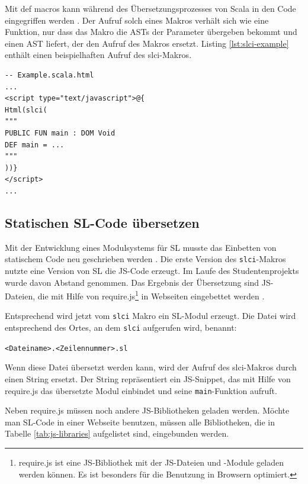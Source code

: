 \documentclass[12pt,bibtotoc]{scrreprt}
\begin{document}
Mit def macros kann während des Übersetzungsprozesses von Scala in den Code eingegriffen werden \cite{EPFL2}. Der Aufruf solch eines Makros verhält sich wie eine Funktion, nur dass das Makro die \ac{AST}s der Parameter übergeben bekommt und einen \ac{AST} liefert, der den Aufruf des Makros ersetzt. Listing \ref{lst:slci-example} enthält einen beispielhaften Aufruf des slci-Makros.

\begin{lstlisting}[caption={Beispielaufruf des slci-Makros in einer Play-View}, label=lst:slci-example, float=h]
-- Example.scala.html
...
<script type="text/javascript">@{
Html(slci(
"""
PUBLIC FUN main : DOM Void
DEF main = ...
"""
))}
</script>
...
\end{lstlisting}

\subsection{Statischen SL-Code übersetzen}
\label{subsec:compile-static-sl}

Mit der Entwicklung eines Modulsystems für \ac{SL} musste das Einbetten von statischem Code neu geschrieben werden \cite{Bisping2013}. Die erste Version des \lstinline!slci!-Makros nutzte eine Version von \ac{SL} die \ac{JS}-Code erzeugt. Im Laufe des Studentenprojekts wurde davon Abstand genommen. Das Ergebnis der Übersetzung sind \ac{JS}-Dateien, die mit Hilfe von require.js\footnote{require.js ist eine JS-Bibliothek mit der JS-Dateien und -Module geladen werden können. Es ist besonders für die Benutzung in Browsern optimiert.} in Webseiten eingebettet werden \cite{RequireJS1}.

Entsprechend wird jetzt vom \lstinline!slci! Makro ein \ac{SL}-Modul erzeugt. Die Datei wird entsprechend des Ortes, an dem \lstinline!slci! aufgerufen wird, benannt:
\begin{center}
\lstinline!<Dateiname>.<Zeilennummer>.sl!
\end{center}
Wenn diese Datei übersetzt werden kann, wird der Aufruf des slci-Makros durch einen String ersetzt. Der String repräsentiert ein JS-Snippet, das mit Hilfe von require.js das übersetzte Modul einbindet und seine \lstinline!main!-Funktion aufruft.

Neben require.js müssen noch andere \ac{JS}-Bibliotheken geladen werden. Möchte man \ac{SL}-Code in einer Webseite benutzen, müssen alle Bibliotheken, die in Tabelle \ref{tab:js-libraries} aufgelistet sind, eingebunden werden.
\end{document}
